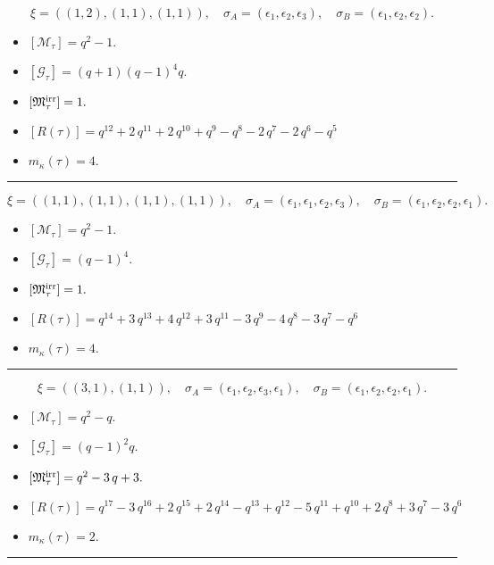 \documentclass[10pt,a4paper]{amsart}
\begin{document}
$$\xi = ({(1, 2), (1, 1)}, {(1, 1)}),\quad \sigma_A = ({{\epsilon_1}, {\epsilon_2}}, {{\epsilon_3}}),\quad \sigma_B = ({{\epsilon_1}, {\epsilon_2}}, {{\epsilon_2}}).$$

\begin{itemize}
 \item $[\mathcal{M}_{\tau}] = q^{2} - 1 .$

 \item $[\mathcal{G}_{\tau}] = {\left(q + 1\right)} {\left(q - 1\right)}^{4} q .$

 \item $[{\frak M}_{\tau}^{\textrm{irr}}] = 1 .$

 \item $[R(\tau)] = q^{12} + 2 \, q^{11} + 2 \, q^{10} + q^{9} - q^{8} - 2 \, q^{7} - 2 \, q^{6} - q^{5} $

 \item $m_{\kappa}(\tau) = 4 .$

 \end{itemize}
\noindent\rule{8cm}{0.4pt}

$$\xi = ({(1, 1), (1, 1), (1, 1)}, {(1, 1)}),\quad \sigma_A = ({{\epsilon_1}, {\epsilon_1}, {\epsilon_2}}, {{\epsilon_3}}),\quad \sigma_B = ({{\epsilon_1}, {\epsilon_2}, {\epsilon_2}}, {{\epsilon_1}}).$$

\begin{itemize}
 \item $[\mathcal{M}_{\tau}] = q^{2} - 1 .$

 \item $[\mathcal{G}_{\tau}] = {\left(q - 1\right)}^{4} .$

 \item $[{\frak M}_{\tau}^{\textrm{irr}}] = 1 .$

 \item $[R(\tau)] = q^{14} + 3 \, q^{13} + 4 \, q^{12} + 3 \, q^{11} - 3 \, q^{9} - 4 \, q^{8} - 3 \, q^{7} - q^{6} $

 \item $m_{\kappa}(\tau) = 4 .$

 \end{itemize}
\noindent\rule{8cm}{0.4pt}

$$\xi = ({(3, 1)}, {(1, 1)}),\quad \sigma_A = ({{\epsilon_1, \epsilon_2, \epsilon_3}}, {{\epsilon_1}}),\quad \sigma_B = ({{\epsilon_1, \epsilon_2, \epsilon_2}}, {{\epsilon_1}}).$$

\begin{itemize}
 \item $[\mathcal{M}_{\tau}] = q^{2} - q .$

 \item $[\mathcal{G}_{\tau}] = {\left(q - 1\right)}^{2} q .$

 \item $[{\frak M}_{\tau}^{\textrm{irr}}] = q^{2} - 3 \, q + 3 .$

 \item $[R(\tau)] = q^{17} - 3 \, q^{16} + 2 \, q^{15} + 2 \, q^{14} - q^{13} + q^{12} - 5 \, q^{11} + q^{10} + 2 \, q^{8} + 3 \, q^{7} - 3 \, q^{6} $

 \item $m_{\kappa}(\tau) = 2 .$

 \end{itemize}
\noindent\rule{8cm}{0.4pt}
\end{document}
